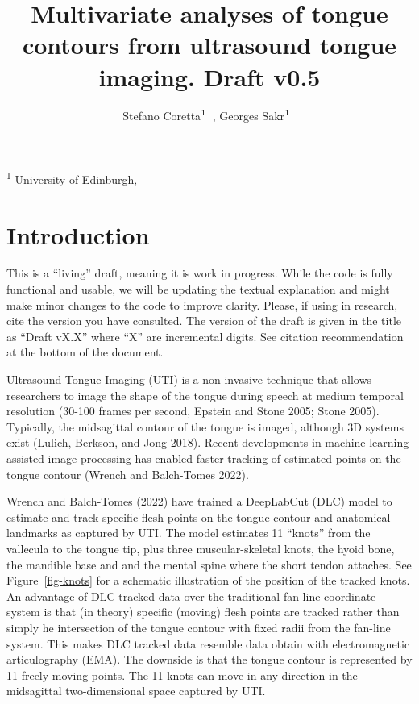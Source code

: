 \documentclass[
]{interact}
\title{Multivariate analyses of tongue contours from ultrasound tongue
imaging. Draft v0.5}
\author{Stefano
Coretta$\textsuperscript{1}$~\orcidlink{0000-0001-9627-5532}, Georges
Sakr$\textsuperscript{1}$~\orcidlink{0000-0003-3813-2669}}
\begin{document}
\captionsetup{labelsep=space}
\maketitle
\textsuperscript{1}  University of Edinburgh,  


\section{Introduction}\label{introduction}

\begin{tcolorbox}[enhanced jigsaw, arc=.35mm, opacityback=0, coltitle=black, colframe=quarto-callout-warning-color-frame, breakable, bottomrule=.15mm, leftrule=.75mm, bottomtitle=1mm, colbacktitle=quarto-callout-warning-color!10!white, opacitybacktitle=0.6, titlerule=0mm, toptitle=1mm, title=\textcolor{quarto-callout-warning-color}{\faExclamationTriangle}\hspace{0.5em}{Warning}, rightrule=.15mm, toprule=.15mm, colback=white, left=2mm]

This is a ``living'' draft, meaning it is work in progress. While the
code is fully functional and usable, we will be updating the textual
explanation and might make minor changes to the code to improve clarity.
Please, if using in research, cite the version you have consulted. The
version of the draft is given in the title as ``Draft vX.X'' where ``X''
are incremental digits. See citation recommendation at the bottom of the
document.

\end{tcolorbox}

Ultrasound Tongue Imaging (UTI) is a non-invasive technique that allows
researchers to image the shape of the tongue during speech at medium
temporal resolution (30-100 frames per second, Epstein and Stone 2005;
Stone 2005). Typically, the midsagittal contour of the tongue is imaged,
although 3D systems exist (Lulich, Berkson, and Jong 2018). Recent
developments in machine learning assisted image processing has enabled
faster tracking of estimated points on the tongue contour (Wrench and
Balch-Tomes 2022).

Wrench and Balch-Tomes (2022) have trained a DeepLabCut (DLC) model to
estimate and track specific flesh points on the tongue contour and
anatomical landmarks as captured by UTI. The model estimates 11
``knots'' from the vallecula to the tongue tip, plus three
muscular-skeletal knots, the hyoid bone, the mandible base and and the
mental spine where the short tendon attaches. See Figure~\ref{fig-knots}
for a schematic illustration of the position of the tracked knots. An
advantage of DLC tracked data over the traditional fan-line coordinate
system is that (in theory) specific (moving) flesh points are tracked
rather than simply he intersection of the tongue contour with fixed
radii from the fan-line system. This makes DLC tracked data resemble
data obtain with electromagnetic articulography (EMA). The downside is
that the tongue contour is represented by 11 freely moving points. The
11 knots can move in any direction in the midsagittal two-dimensional
space captured by UTI.
\end{document}
